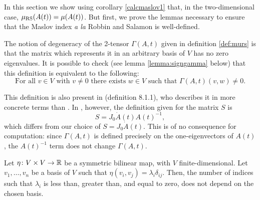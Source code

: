 In this section we show using corollary \ref{calcmaslov1} that, in the two-dimensional case, $\mu_{\mathrm{RS}}(A(t)) = \mu(A(t))$. But first, we prove the lemmas necessary to ensure that the Maslov index \textit{a la} Robbin and Salamon is well-defined.

\begin{remark}\label{rmk:degendef}
The notion of degeneracy of the 2-tensor $\Gamma(A,t)$ given in definition \ref{def:murs} is that the matrix which represents it in an arbitrary basis of $V$ has no zero eigenvalues. It is possible to check (see lemma \ref{lemma:signgamma} below) that this definition is equivalent to the following:
\begin{equation}
\text{For all $v \in V$ with $v \neq 0$ there exists $w \in V$ such that $\Gamma(A,t)(v,w) \neq 0$.}
\end{equation}
\end{remark}

\begin{remark}
This definition is also present in \cite{polterovich} (definition 8.1.1), who describes it in more concrete terms than \cite{robbin1993maslov}. In \cite{polterovich}, however, the definition given for the matrix $S$ is
\begin{equation}
S = J_0 \dot A(t) A(t)^{-1},
\end{equation}
which differs from our choice of $S = J_0 \dot A(t)$. This is of no consequence for computation: since $\Gamma(A,t)$ is defined precisely on the one-eigenvectors of $A(t)$, the $A(t)^{-1}$ term does not change $\Gamma(A,t)$.
\end{remark}

\begin{lemma}\label{lemma:signgamma}
Let $\eta \colon V \times V \to \mathbb{R}$ be a symmetric bilinear map, with $V$ finite-dimensional. Let $v_1, \dots, v_n$ be a basis of $V$ such that $\eta(v_i, v_j) = \lambda_i \delta_{ij}$. Then, the number of indices such that $\lambda_i$ is less than, greater than, and equal to zero, does not depend on the chosen basis.
\end{lemma}

